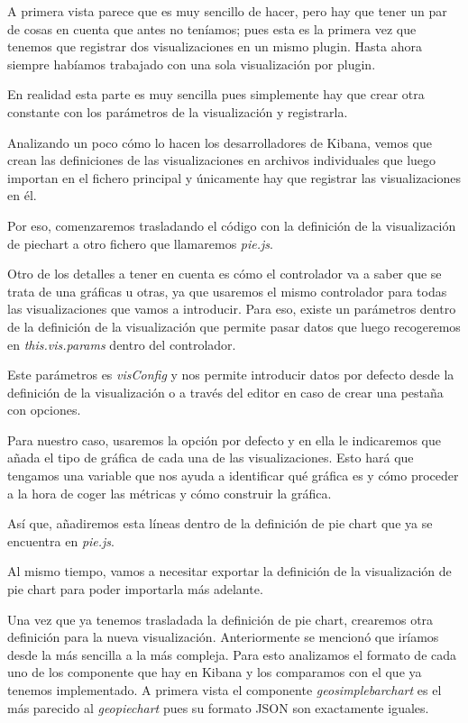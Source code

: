 \documentclass[a4paper, 12pt]{book}
\begin{document}
A primera vista parece que es muy sencillo de hacer, pero hay que tener un par de cosas en cuenta que antes no teníamos; pues esta es la primera vez que tenemos que registrar dos visualizaciones en un mismo plugin. Hasta ahora siempre habíamos trabajado con una sola visualización por plugin. 

En realidad esta parte es muy sencilla pues simplemente hay que crear otra constante con los parámetros de la visualización y registrarla. 

Analizando un poco cómo lo hacen los desarrolladores de Kibana, vemos que crean las definiciones de las visualizaciones en archivos individuales que luego importan en el fichero principal y únicamente hay que registrar las visualizaciones en él. 

Por eso, comenzaremos trasladando el código con la definición de la visualización de piechart a otro fichero que llamaremos \textit{pie.js}. 

Otro de los detalles a tener en cuenta es cómo el controlador va a saber que se trata de una gráficas u otras, ya que usaremos el mismo controlador para todas las visualizaciones que vamos a introducir. Para eso, existe un parámetros dentro de la definición de la visualización que permite pasar datos que luego recogeremos en \textit{this.vis.params} dentro del controlador.

Este parámetros es \textit{visConfig} y nos permite introducir datos por defecto desde la definición de la visualización o a través del editor en caso de crear una pestaña con opciones. 

Para nuestro caso, usaremos la opción por defecto y en ella le indicaremos que añada el tipo de gráfica de cada una de las visualizaciones. Esto hará que tengamos una variable que nos ayuda a identificar qué gráfica es y cómo proceder a la hora de coger las métricas y cómo construir la gráfica.

Así que, añadiremos esta líneas dentro de la definición de pie chart que ya se encuentra en \textit{pie.js}.



Al mismo tiempo, vamos a necesitar exportar la definición de la visualización de pie chart para poder importarla más adelante.



Una vez que ya tenemos trasladada la definición de pie chart, crearemos otra definición para la nueva visualización. Anteriormente se mencionó que iríamos desde la más sencilla a la más compleja. Para esto analizamos el formato de cada uno de los componente que hay en Kibana y los comparamos con el que ya tenemos implementado. A primera vista el componente \textit{geosimplebarchart} es el más parecido al \textit{geopiechart} pues su formato JSON son exactamente iguales.
\end{document}
